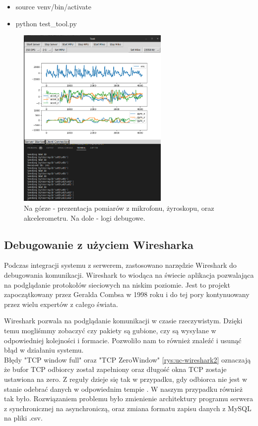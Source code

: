 \documentclass[12pt,oneside,a4paper]{book}
\theoremstyle{break}
\begin{document}
\begin{itemize}
    \item source venv/bin/activate
    \item python test\_tool.py
\end{itemize}

\begin{figure}[H]
    \begin{center}
        \includegraphics[width=0.65\textwidth]{pytestmic}
        \caption{Na górze - prezentacja pomiarów z mikrofonu, żyroskopu, oraz akcelerometru. Na dole - logi debugowe.}
        \label{rys:uc-pytest}
    \end{center}
\end{figure}

\subsection{Debugowanie z użyciem Wiresharka}

Podczas integracji systemu z serwerem, zastosowano narzędzie Wireshark do debugowania komunikacji.
Wireshark to wiodąca na świecie aplikacja pozwalająca na podglądanie protokołów sieciowych na niskim poziomie.
Jest to projekt zapoczątkowany przez Geralda Combsa w 1998 roku i do tej pory kontynuowany przez
wielu expertów z całego świata. \cite{wireshark}
\par Wireshark pozwala na podglądanie komunikacji w czasie rzeczywistym. Dzięki temu mogliśmmy zobaczyć czy pakiety są gubione,
czy są wysyłane w odpowiedniej kolejności i formacie. Pozwoliło nam to również znaleźć i usunąć błąd w działaniu systemu.\\
Błędy "TCP window full" oraz "TCP ZeroWindow" \ref{rys:uc-wireshark2} oznaczają że bufor TCP odbiorcy został zapełniony oraz długość okna TCP zostaje ustawiona na zero.
Z reguły dzieje się tak w przypadku, gdy odbiorca nie jest w stanie odebrać danych w odpowiednim tempie \cite{wireshark-zerowindow}. W naszym przypadku
również tak było. Rozwiązaniem problemu było zmienienie architektury programu serwera z synchronicznej na asynchroniczą, oraz zmiana
formatu zapisu danych z MySQL na pliki .csv.
\end{document}
